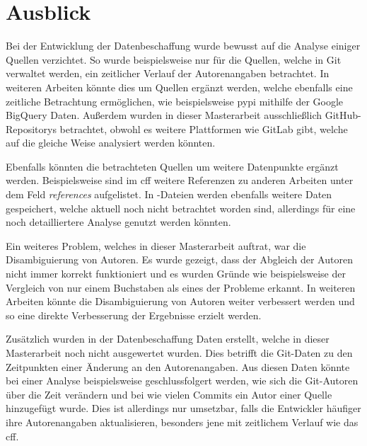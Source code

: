 \section{Ausblick}
\label{sec:ausblick}
Bei der Entwicklung der Datenbeschaffung wurde bewusst auf die Analyse einiger Quellen verzichtet.
So wurde beispielsweise nur für die Quellen, welche in Git verwaltet werden, ein zeitlicher Verlauf der Autorenangaben betrachtet.
In weiteren Arbeiten könnte dies um Quellen ergänzt werden, welche ebenfalls eine zeitliche Betrachtung ermöglichen, wie beispielsweise \gls{pypi} mithilfe der Google BigQuery Daten.
Außerdem wurden in dieser Masterarbeit ausschließlich GitHub-Repositorys betrachtet, obwohl es weitere Plattformen wie GitLab gibt, welche auf die gleiche Weise analysiert werden könnten.

Ebenfalls könnten die betrachteten Quellen um weitere Datenpunkte ergänzt werden.
Beispielsweise sind im \gls{cff} weitere Referenzen zu anderen Arbeiten unter dem Feld \emph{references} aufgelistet.
In -Dateien werden ebenfalls weitere Daten gespeichert, welche aktuell noch nicht betrachtet worden sind, allerdings für eine noch detailliertere Analyse genutzt werden könnten.

Ein weiteres Problem, welches in dieser Masterarbeit auftrat, war die Disambiguierung von Autoren.
Es wurde gezeigt, dass der Abgleich der Autoren nicht immer korrekt funktioniert und es wurden Gründe wie beispielsweise der Vergleich von nur einem Buchstaben als eines der Probleme erkannt.
In weiteren Arbeiten könnte die Disambiguierung von Autoren weiter verbessert werden und so eine direkte Verbesserung der Ergebnisse erzielt werden.

Zusätzlich wurden in der Datenbeschaffung Daten erstellt, welche in dieser Masterarbeit noch nicht ausgewertet wurden.
Dies betrifft die Git-Daten zu den Zeitpunkten einer Änderung an den Autorenangaben.
Aus diesen Daten könnte bei einer Analyse beispielsweise geschlussfolgert werden, wie sich die Git-Autoren über die Zeit verändern und bei wie vielen Commits ein Autor einer Quelle hinzugefügt wurde.
Dies ist allerdings nur umsetzbar, falls die Entwickler häufiger ihre Autorenangaben aktualisieren, besonders jene mit zeitlichem Verlauf wie das \gls{cff}.
